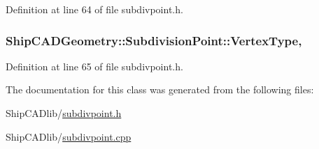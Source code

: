 Definition at line 64 of file subdivpoint.\-h.

\hypertarget{classShipCADGeometry_1_1SubdivisionPoint_a194e5f0d73d3af0bd21fa3cd4fa03296}{
\subsubsection[{Vertex\-Type}]{ Ship\-C\-A\-D\-Geometry\-::\-Subdivision\-Point\-::\-Vertex\-Type\hspace{0.3cm}{\ttfamily [read]}, {\ttfamily [write]}}}\label{classShipCADGeometry_1_1SubdivisionPoint_a194e5f0d73d3af0bd21fa3cd4fa03296}


Definition at line 65 of file subdivpoint.\-h.



The documentation for this class was generated from the following files\-:\begin{DoxyCompactItemize}
\item 
Ship\-C\-A\-Dlib/\hyperlink{subdivpoint_8h}{subdivpoint.\-h}\item 
Ship\-C\-A\-Dlib/\hyperlink{subdivpoint_8cpp}{subdivpoint.\-cpp}\end{DoxyCompactItemize}
